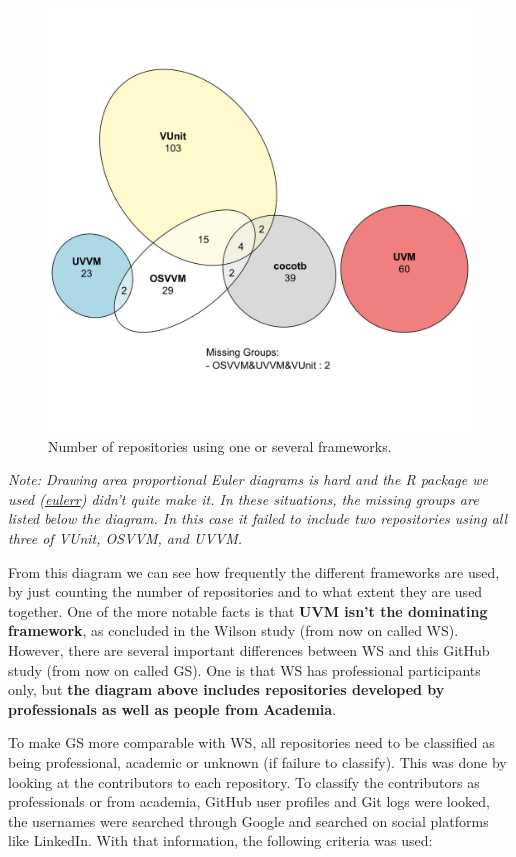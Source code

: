 \documentclass[]{article}
\begin{document}
\begin{figure}

{\centering \includegraphics[width=0.75\linewidth]{img/total_repo_framework_distribution} 

}

\caption{Number of repositories using one or several frameworks.}\label{fig:total-repo-mix}
\end{figure}

\emph{Note: Drawing area proportional Euler diagrams is hard and the R package we used (\href{https://cran.r-project.org/web/packages/eulerr/}{eulerr}) didn't quite make it. In these situations, the missing groups are listed below the diagram. In this case it failed to include two repositories using all three of VUnit, OSVVM, and UVVM.}

From this diagram we can see how frequently the different frameworks are used, by just counting the number of repositories and to what extent they are used together. One of the more notable facts is that \textbf{UVM isn't the dominating framework}, as concluded in the Wilson study \autocite{wilson18} (from now on called WS). However, there are several important differences between WS and this GitHub study (from now on called GS). One is that WS has professional participants only, but \textbf{the diagram above includes repositories developed by professionals as well as people from Academia}.

To make GS more comparable with WS, all repositories need to be classified as being professional, academic or unknown (if failure to classify). This was done by looking at the contributors to each repository. To classify the contributors as professionals or from academia, GitHub user profiles and Git logs were looked, the usernames were searched through Google and searched on social platforms like LinkedIn. With that information, the following criteria was used:
\end{document}
